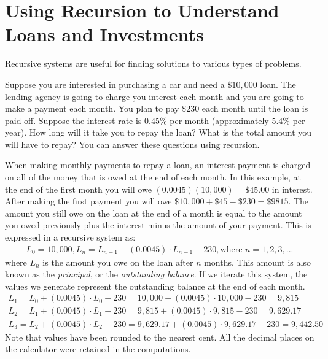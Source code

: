 \documentclass[10pt,]{book}
\theoremstyle{plain}
\theoremstyle{definition}
\theoremstyle{definition}
\theoremstyle{definition}
\numberwithin{equation}{section}
\begin{document}
\section[{Using Recursion to Understand Loans and Investments}]{Using Recursion to Understand Loans and Investments}\label{chapter04-section02}
\hypertarget{p-30}{}%
Recursive systems are useful for finding solutions to various types of problems.%
\par
\hypertarget{p-31}{}%
Suppose you are interested in purchasing a car and need a \(\$10,000\) loan. The lending agency is going to charge you interest each month and you are going to make a payment each month. You plan to pay \(\$230\) each month until the loan is paid off. Suppose the interest rate is \(0.45\%\) per month (approximately \(5.4\%\) per year). How long will it take you to repay the loan? What is the total amount you will have to repay?  You can answer these questions using recursion.%
\par
\hypertarget{p-32}{}%
When making monthly payments to repay a loan, an interest payment is charged on all of the money that is owed at the end of each month.  In this example, at the end of the first month you will owe \((0.0045)(10,000)=\$45.00\) in interest. After making the first payment you will owe \(\$10,000+\$45-\$230=\$9815\). The amount you still owe on the loan at the end of a month is equal to the amount you owed previously plus the interest minus the amount of your payment. This is expressed in a recursive system as:%
%
\begin{gather*}
L_0=10,000, L_n = L_{n-1}+(0.0045)\cdot L_{n-1}-230, \text{where } n=1,2,3,...
\end{gather*}
\hypertarget{p-33}{}%
where \(L_n\) is the amount you owe on the loan after \(n\) months.  This amount is also known as the \emph{principal}, or the \emph{outstanding balance}. If we iterate this system, the values we generate represent the outstanding balance at the end of each month.%
%
\begin{gather*}
L_1=L_0+(0.0045)\cdot L_0-230=10,000+(0.0045)\cdot 10,000-230=9,815\\
L_2=L_1+(0.0045)\cdot L_1-230=9,815+(0.0045)\cdot 9,815-230=9,629.17\\
L_3=L_2+(0.0045)\cdot L_2-230=9,629.17+(0.0045)\cdot 9,629.17-230=9,442.50
\end{gather*}
\hypertarget{p-34}{}%
Note that values have been rounded to the nearest cent.  All the decimal places on the calculator were retained in the computations.%
\par
\end{document}
